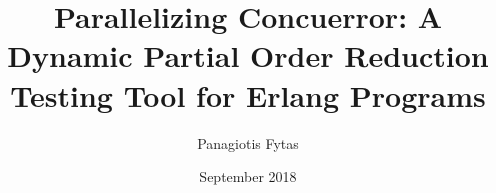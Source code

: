 \documentclass[diploma, greek]{softlab-thesis}
\theoremstyle{definition}
\begin{document}

\frontmatter

\title{Parallelizing Concuerror: A Dynamic Partial Order Reduction Testing Tool for Erlang Programs}
\author{Panagiotis Fytas}
\date{September 2018}




\maketitle



\begin{abstractgr}%
  

  
\begin{keywordsgr}

\end{keywordsgr}
\end{abstractgr}



\begin{abstracten}%
  

  
\begin{keywordsen}

\end{keywordsen}
\end{abstracten}




\begin{acknowledgementsgr}


\end{acknowledgementsgr}


\begin{acknowledgementsen}


\end{acknowledgementsen}


\tableofcontents
\listoftables
\listoffigures
\listoflistings
\listofalgorithms
{}

\mainmatter




 

 



\nocite{*}







\end{document}
